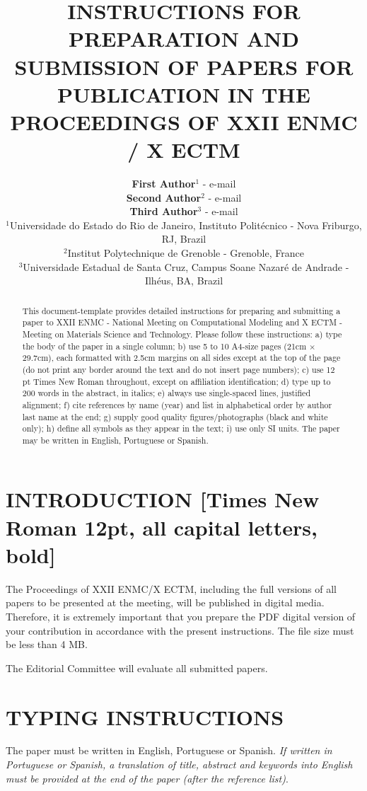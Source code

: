 \documentclass[12pt,fleqn]{article}
\title{INSTRUCTIONS FOR PREPARATION AND SUBMISSION OF PAPERS FOR PUBLICATION IN THE PROCEEDINGS OF XXII ENMC / X ECTM}
\author
    {\rm \begin{tabular}{l} 
    \textbf{First Author}$^{1}$ - {\textnormal e-mail}\\%
    \textbf{Second Author}$^{2}$ - {\textnormal e-mail}\\
    \textbf{Third Author}$^{3}$ - {\textnormal e-mail}\\
    {\fontsize{11}{0}\selectfont $^{1}$Universidade do Estado do Rio de Janeiro, Instituto Politécnico - Nova Friburgo, RJ, Brazil}\vspace*{-0.05cm} \\
    {\fontsize{11}{0}\selectfont $^{2}$Institut Polytechnique de Grenoble - Grenoble, France}\vspace*{-0.05cm}\\
    {\fontsize{11}{0}\selectfont $^{3}$Universidade Estadual de Santa Cruz, Campus Soane Nazaré de Andrade - Ilhéus, BA, Brazil}
  \end{tabular}}
\begin{document}
\maketitle

\thispagestyle{firspagetstyle}
\begin{abstract}
This document-template provides detailed instructions for preparing and submitting a paper to XXII ENMC - National Meeting on Computational Modeling and X ECTM -Meeting on Materials Science and Technology. Please follow these instructions: a) type the body of the paper in a single column; b) use 5 to 10 A4-size pages (21cm $\times$ 29.7cm), each formatted with 2.5cm margins on all sides except at the top of the page (do not print any border around the text and do not insert page numbers); c) use 12 pt Times New Roman throughout, except on affiliation identification; d) type up to 200 words in the abstract, in italics; e) always use single-spaced lines, justified alignment; f) cite references by name (year) and list in alphabetical order by author last name at the end; g) supply good quality figures/photographs (black and white only); h) define all symbols as they appear in the text; i) use only SI units. The paper may be written in English, Portuguese or Spanish.
\end{abstract}


\pagestyle{empty}

\section{INTRODUCTION [Times New Roman 12pt, all capital letters, bold]}
The Proceedings of XXII ENMC/X ECTM, including the full versions of all papers to be presented at the meeting, will be published in digital media. Therefore, it is extremely important that you prepare the PDF digital version of your contribution in accordance with the present instructions. The file size must be less than 4 MB.

The Editorial Committee will evaluate all submitted papers.

\section{TYPING INSTRUCTIONS}
The paper must be written in English, Portuguese or Spanish. {\it If written in Portuguese or Spanish, a translation of title, abstract and keywords into English must be provided at the end of the paper (after the reference list)}.
\end{document}
